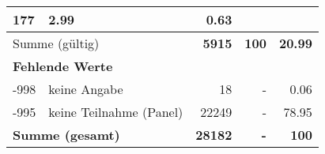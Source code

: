 \begin{longtable}{lXrrr}
       \num{177} &
       \num[round-mode=places,round-precision=2]{2.99} &
         \num[round-mode=places,round-precision=2]{0.63} \\
     \midrule
     \multicolumn{2}{l}{Summe (gültig)} &
       \textbf{\num{5915}} &
     \textbf{\num{100}} &
       \textbf{\num[round-mode=places,round-precision=2]{20.99}} \\
     \multicolumn{5}{l}{\textbf{Fehlende Werte}}\\
       -998 &
       keine Angabe &
         \num{18} &
        - &
         \num[round-mode=places,round-precision=2]{0.06} \\
       -995 &
       keine Teilnahme (Panel) &
         \num{22249} &
        - &
         \num[round-mode=places,round-precision=2]{78.95} \\
     \midrule
     \multicolumn{2}{l}{\textbf{Summe (gesamt)}} &
          \textbf{\num{28182}} &
        \textbf{-} &
        \textbf{\num{100}} \\
     \bottomrule
     \end{longtable}
     
